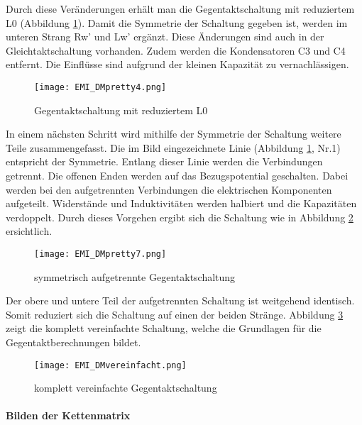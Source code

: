 Durch diese Veränderungen erhält man die Gegentaktschaltung mit reduziertem L0 (Abbildung \ref{fig:DMSchaltungreduziertL0}). Damit die Symmetrie der Schaltung gegeben ist, werden im unteren Strang Rw’ und Lw’ ergänzt. Diese Änderungen sind auch in der Gleichtaktschaltung vorhanden. Zudem werden die Kondensatoren C3 und C4 entfernt. Die Einflüsse sind aufgrund der kleinen Kapazität zu vernachlässigen. 

\begin{figure}[H]
	\centering
	\texttt{[image: EMI\_DMpretty4.png]}
	\caption{Gegentaktschaltung mit reduziertem L0}
	\label{fig:DMSchaltungreduziertL0}
\end{figure}

In einem nächsten Schritt wird mithilfe der Symmetrie der Schaltung weitere Teile zusammengefasst. Die im Bild eingezeichnete Linie (Abbildung \ref{fig:DMSchaltungreduziertL0}, Nr.1) entspricht der Symmetrie. Entlang dieser Linie werden die Verbindungen getrennt. Die offenen Enden werden auf das Bezugspotential geschalten. Dabei werden bei den aufgetrennten Verbindungen die elektrischen Komponenten aufgeteilt. Widerstände und Induktivitäten werden halbiert und die Kapazitäten verdoppelt. Durch dieses Vorgehen ergibt sich die Schaltung wie in Abbildung \ref{fig:DMSchaltungSymAufgetrennt} ersichtlich.

\begin{figure}[H]
	\centering
	\texttt{[image: EMI\_DMpretty7.png]}
	\caption{symmetrisch aufgetrennte Gegentaktschaltung}
	\label{fig:DMSchaltungSymAufgetrennt}
\end{figure}

Der obere und untere Teil der aufgetrennten Schaltung ist weitgehend identisch. Somit reduziert sich die Schaltung auf einen der beiden Stränge. Abbildung \ref{fig:DMSchaltungvereinfacht} zeigt die komplett vereinfachte Schaltung, welche die Grundlagen für die Gegentaktberechnungen bildet. 

\begin{figure}[H]
	\centering
	\texttt{[image: EMI\_DMvereinfacht.png]}
	\caption{komplett vereinfachte Gegentaktschaltung}
	\label{fig:DMSchaltungvereinfacht}
\end{figure}

\paragraph{Bilden der Kettenmatrix}\label{para:kettenGegentakt}

